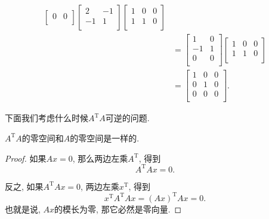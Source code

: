 \begin{example}
\begin{equation}
\begin{aligned}
\begin{bmatrix}
             0 & 0\\
            \end{bmatrix}
            \begin{bmatrix}
             2 & -1\\
             -1 & 1\\
            \end{bmatrix}
            \begin{bmatrix}
             1 & 0 & 0\\
             1 & 1 & 0\\
            \end{bmatrix}
            \\
            & =
            \begin{bmatrix}
             1 & 0\\
             -1 & 1\\
             0 & 0\\
            \end{bmatrix}
            \begin{bmatrix}
             1 & 0 & 0\\
             1 & 1 & 0\\
            \end{bmatrix}
            \\
            & =
            \begin{bmatrix}
             1 & 0 & 0\\
             0 & 1 & 0\\
             0 & 0 & 0\\
            \end{bmatrix}.
        \end{aligned}
    \end{equation}
\end{example}

下面我们考虑什么时候$A^{\mathrm{T}}A$可逆的问题.
\begin{proposition}
    $A^{\mathrm{T}}A$的零空间和$A$的零空间是一样的.
\end{proposition}

\begin{proof}
    如果$Ax=0$, 那么两边左乘$A^{\mathrm{T}}$, 得到
    \begin{equation}
      A^{\mathrm{T}}A x = 0.
    \end{equation}

    反之, 如果$A^{\mathrm{T}}Ax=0$, 两边左乘$x^{\mathrm{T}}$, 得到
    \begin{equation}
      x^{\mathrm{T}} A^{\mathrm{T}} A x = \left( Ax \right) ^{\mathrm{T}} Ax = 0.
    \end{equation}
    也就是说, $Ax$的模长为零, 那它必然是零向量.
\end{proof}

